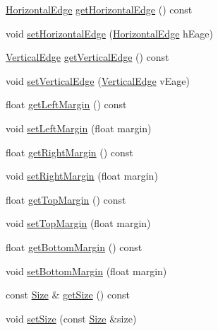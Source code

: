 \begin{DoxyCompactItemize}
\item 
\hyperlink{classui_1_1LayoutComponent_aaa61687a8a4e98f525413e1f0cfacf18}{Horizontal\+Edge} \hyperlink{classui_1_1LayoutComponent_af23f1c68ba944cea8baf0b89acb642a9}{get\+Horizontal\+Edge} () const
\item 
void \hyperlink{classui_1_1LayoutComponent_ad3f90ecb148baf2a40773d0d61c7a0fb}{set\+Horizontal\+Edge} (\hyperlink{classui_1_1LayoutComponent_aaa61687a8a4e98f525413e1f0cfacf18}{Horizontal\+Edge} h\+Eage)
\item 
\hyperlink{classui_1_1LayoutComponent_a186978dac32f26bf251942e893999c8f}{Vertical\+Edge} \hyperlink{classui_1_1LayoutComponent_a1566ea2b1a76ce749a8429e42aa22e2c}{get\+Vertical\+Edge} () const
\item 
void \hyperlink{classui_1_1LayoutComponent_a3fa4ab390686d8cab0ee1f3d1ff56e86}{set\+Vertical\+Edge} (\hyperlink{classui_1_1LayoutComponent_a186978dac32f26bf251942e893999c8f}{Vertical\+Edge} v\+Eage)
\item 
float \hyperlink{classui_1_1LayoutComponent_a1d6daf298cc0dc49334d6ecf66ee6fe7}{get\+Left\+Margin} () const
\item 
void \hyperlink{classui_1_1LayoutComponent_a2e26517ace9816d2350b23e1f0bb482d}{set\+Left\+Margin} (float margin)
\item 
float \hyperlink{classui_1_1LayoutComponent_a298c916ad2bba6bb4720574388a9938d}{get\+Right\+Margin} () const
\item 
void \hyperlink{classui_1_1LayoutComponent_a29db78fd2bd2fce9ce04526ae55377e3}{set\+Right\+Margin} (float margin)
\item 
float \hyperlink{classui_1_1LayoutComponent_a21749ecc8ce29be5518a54328f7508d8}{get\+Top\+Margin} () const
\item 
void \hyperlink{classui_1_1LayoutComponent_a3f88a5fedef99e54d7a78794f4bd193a}{set\+Top\+Margin} (float margin)
\item 
float \hyperlink{classui_1_1LayoutComponent_a264d31acf95b9361026acbd2ebf54e12}{get\+Bottom\+Margin} () const
\item 
void \hyperlink{classui_1_1LayoutComponent_a8c6be07216609a96c1721308c25e5384}{set\+Bottom\+Margin} (float margin)
\item 
const \hyperlink{classSize}{Size} \& \hyperlink{classui_1_1LayoutComponent_a9705cc41143d6f9a177efb8a8e2838e8}{get\+Size} () const
\item 
void \hyperlink{classui_1_1LayoutComponent_a22fea5cb274bb846dd45c6e212e8b9e3}{set\+Size} (const \hyperlink{classSize}{Size} \&size)
\item 

\end{DoxyCompactItemize}
